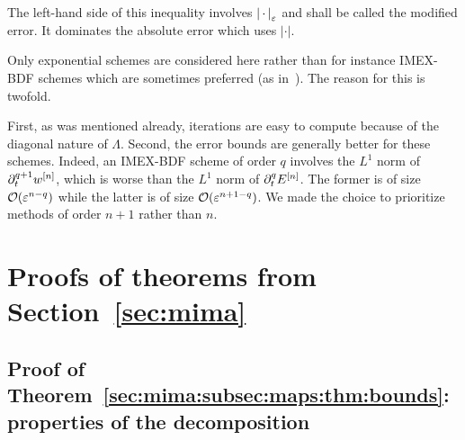 The left-hand side of this inequality involves $\left\vert  \, \cdot \,  \right\vert _{\varepsilon}$ 
and shall be called the modified error. 
It dominates the absolute error which uses $| \cdot |$. 

\begin{remark} \label{mima_rq:imex}
Only exponential schemes are considered here rather than for instance 
IMEX-BDF schemes which are sometimes preferred (as in~\cite{hu.2021.uniform}). 
The reason for this is twofold. 

First, as was mentioned already, iterations are easy to compute because 
of the diagonal nature of $\Lambda$. 
Second, %
the error bounds are generally better for these schemes. 
Indeed, an IMEX-BDF scheme of order $q$ involves the $L^1$ norm of $\partial_t^{q+1} w^{[n]}$, 
which is worse than the $L^1$ norm of $\partial_t^q E^{[n]}$. 
The former is of size $\mathcal{O}(\varepsilon^{n-q})$ while the latter is of size $\mathcal{O}(\varepsilon^{n+1-q})$.
We made the choice to prioritize methods of order $n+1$ rather than $n$.
\end{remark}









\section{Proofs of theorems from Section~\ref{sec:mima}} 
\label{sec:proofs}






\subsection{Proof of Theorem~\ref{sec:mima:subsec:maps:thm:bounds}:
properties of the decomposition}
\label{sec:proofs:subsec:bounds}

\newcommand{\T}{\mathbb{T}}

